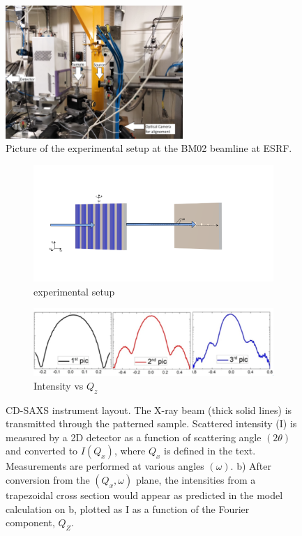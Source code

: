 \begin{figure}[h]
\centering
\includegraphics[width=0.6\textwidth]{images/photo_exp.jpg}
\caption{Picture of the experimental setup at the BM02 beamline at ESRF.}
\label{fig:exp_setup_real}
\end{figure}%
\begin{figure}[h]
    \centering
    \begin{subfigure}[b]{0.8\textwidth}
        \includegraphics[width=\textwidth]{images/cdsaxs_diff.png}
        \caption{experimental setup}
        \label{fig:exp_setup}
    \end{subfigure}
    
    \begin{subfigure}[b]{0.4\textwidth}
        \includegraphics[width=\textwidth]{images/intensity_qz.png}
        \caption{Intensity vs $Q_z$}
    \end{subfigure}
    
    \caption{CD-SAXS instrument layout. The X-ray beam (thick solid lines) is transmitted through the 
    patterned sample. Scattered intensity (I) is measured by a 2D detector as a function of scattering angle $(2\theta)$ 
    and converted to $I(Q_{x})$, where $Q_{x}$ is defined in the text. Measurements are performed at various angles $(\omega)$. b) After conversion from the $(Q_{x},\omega)$
    plane, the intensities from a trapezoidal cross section would appear as predicted in
    the model calculation on b, plotted as I as a function of the Fourier component, $Q_{Z}$.}
    \label{fig:isolated_line}
\end{figure}

